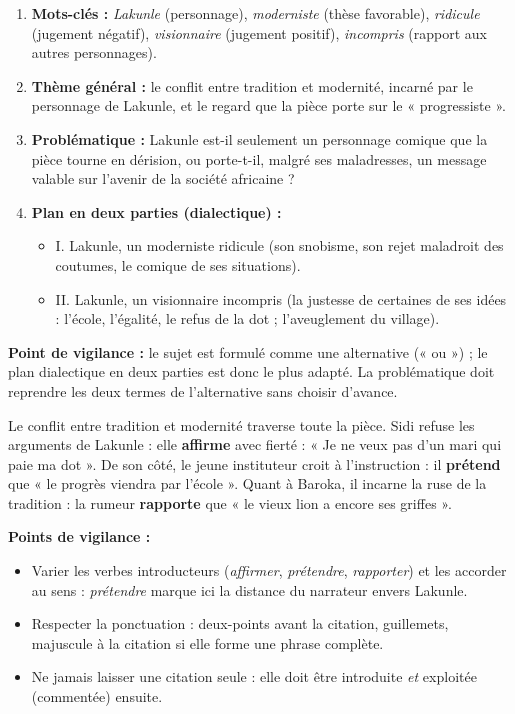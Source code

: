 \documentclass[11pt]{article}
\begin{document}
\begin{corrige}
\begin{enumerate}
\item \textbf{Mots-clés :} \emph{Lakunle} (personnage), \emph{moderniste} (thèse favorable), \emph{ridicule} (jugement négatif), \emph{visionnaire} (jugement positif), \emph{incompris} (rapport aux autres personnages).
\item \textbf{Thème général :} le conflit entre tradition et modernité, incarné par le personnage de Lakunle, et le regard que la pièce porte sur le « progressiste ».
\item \textbf{Problématique :} Lakunle est-il seulement un personnage comique que la pièce tourne en dérision, ou porte-t-il, malgré ses maladresses, un message valable sur l'avenir de la société africaine ?
\item \textbf{Plan en deux parties (dialectique) :}
\begin{itemize}
\item I. Lakunle, un moderniste ridicule (son snobisme, son rejet maladroit des coutumes, le comique de ses situations).
\item II. Lakunle, un visionnaire incompris (la justesse de certaines de ses idées : l'école, l'égalité, le refus de la dot ; l'aveuglement du village).
\end{itemize}
\end{enumerate}
\textbf{Point de vigilance :} le sujet est formulé comme une alternative (« ou ») ; le plan dialectique en deux parties est donc le plus adapté. La problématique doit reprendre les deux termes de l'alternative sans choisir d'avance.
\end{corrige}

\begin{corrige}
Le conflit entre tradition et modernité traverse toute la pièce. Sidi refuse les arguments de Lakunle : elle \textbf{affirme} avec fierté : « Je ne veux pas d'un mari qui paie ma dot ». De son côté, le jeune instituteur croit à l'instruction : il \textbf{prétend} que « le progrès viendra par l'école ». Quant à Baroka, il incarne la ruse de la tradition : la rumeur \textbf{rapporte} que « le vieux lion a encore ses griffes ».

\textbf{Points de vigilance :}
\begin{itemize}
\item Varier les verbes introducteurs (\emph{affirmer}, \emph{prétendre}, \emph{rapporter}) et les accorder au sens : \emph{prétendre} marque ici la distance du narrateur envers Lakunle.
\item Respecter la ponctuation : deux-points avant la citation, guillemets, majuscule à la citation si elle forme une phrase complète.
\item Ne jamais laisser une citation seule : elle doit être introduite \emph{et} exploitée (commentée) ensuite.
\end{itemize}
\end{corrige}
\end{document}
